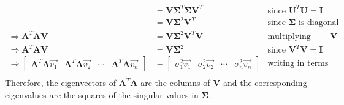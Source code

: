 \documentclass[11pt, fleqn]{article}
\begin{document}
\begin{enumerate}
\begin{align*}
        &= \textbf{V} \boldsymbol{\Sigma}^T \boldsymbol{\Sigma} \textbf{V}^T & \text{since } \textbf{U}^T \textbf{U} = \textbf{I} \\
        &= \textbf{V} \boldsymbol{\Sigma}^2 \textbf{V}^T & \text{since } \boldsymbol{\Sigma} \text{ is diagonal} \\
        \Rightarrow \textbf{A}^T\textbf{A} \textbf{V} &= \textbf{V} \boldsymbol{\Sigma}^2 \textbf{V}^T \textbf{V} & \text{multiplying both sides by } \textbf{V} \\
        \Rightarrow \textbf{A}^T\textbf{A} \textbf{V} &= \textbf{V} \boldsymbol{\Sigma}^2 & \text{since } \textbf{V}^T \textbf{V} = \textbf{I} \\
        \Rightarrow \begin{bmatrix}
            \textbf{A}^T\textbf{A} \vec{v_1} & \textbf{A}^T\textbf{A} \vec{v_2} & \cdots & \textbf{A}^T\textbf{A} \vec{v_n}
        \end{bmatrix} &= \begin{bmatrix}
            \sigma_1^2 \vec{v_1} & \sigma_2^2 \vec{v_2} & \cdots & \sigma_n^2 \vec{v_n}
        \end{bmatrix} & \text{writing in terms of columns} \\
    \end{align*}
    Therefore, the eigenvectors of $\textbf{A}^T \textbf{A}$ are the columns of $\textbf{V}$ and the corresponding eigenvalues are the squares of the singular values in $\boldsymbol{\Sigma}$.
\end{enumerate}

\newpage
\end{document}
